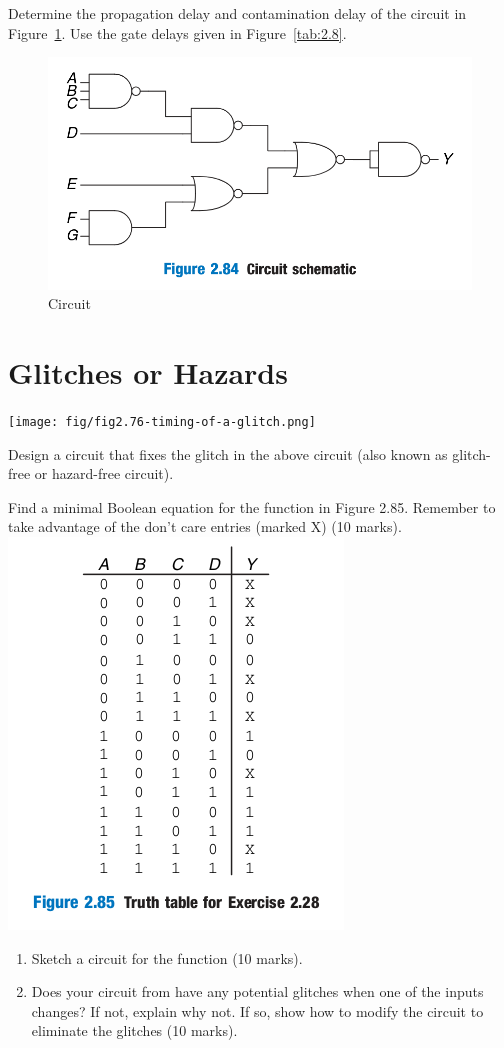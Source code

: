 \begin{prob}
Determine the propagation delay and contamination delay of the
circuit in Figure~\ref{fig:2.84}. Use the gate delays given in Figure~\ref{tab:2.8}.
\end{prob}
\begin{figure}[h!]
  \includegraphics[width=0.5\linewidth]{fig/fig-2.84.png}
  \caption{Circuit}
  \label{fig:2.84}
\end{figure}

\section{Glitches or Hazards}
\texttt{[image: fig/fig2.76-timing-of-a-glitch.png]}
\begin{definition}

\end{definition}
\vspace{5em}

\begin{example}
  Design a circuit that fixes the glitch in the above circuit (also known as
  glitch-free or hazard-free circuit).
\end{example}
\vspace{10em}


\begin{prob}
  Find a minimal Boolean equation for the function in Figure 2.85.
  Remember to take advantage of the don’t care entries (marked X) (10 marks).\\
  \includegraphics[width=0.3\linewidth]{homeworks/hw3.5/fig/fig2.85-truth-table.png}
  \begin{enumerate}
  \item Sketch a circuit for the function (10 marks).
  \item Does your circuit from have any potential glitches
    when one of the inputs changes? If not, explain why not. If so, show how to
    modify the circuit to eliminate the glitches (10 marks).
  \end{enumerate}
\end{prob}

